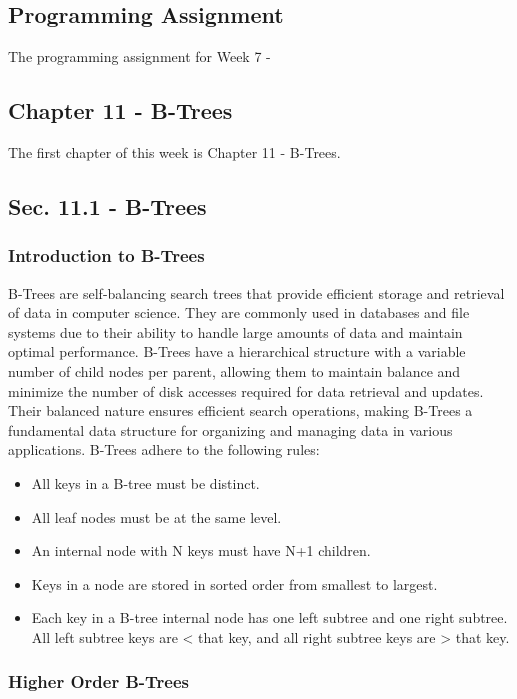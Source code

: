 \subsection{Programming Assignment}

The programming assignment for Week 7 - 

\subsection{Chapter 11 - B-Trees}

The first chapter of this week is Chapter 11 - B-Trees.

\subsection*{Sec. 11.1 - B-Trees}

\subsubsection{Introduction to B-Trees}

B-Trees are self-balancing search trees that provide efficient storage and retrieval of data in computer science. They are commonly used in databases and file systems due to their ability to handle large amounts of data and maintain optimal performance. B-Trees have a hierarchical structure with a variable number of child nodes per parent, 
allowing them to maintain balance and minimize the number of disk accesses required for data retrieval and updates. Their balanced nature ensures efficient search operations, making B-Trees a fundamental data structure for organizing and managing data in various applications. B-Trees adhere to the following rules:

\begin{itemize}
    \item All keys in a B-tree must be distinct.
    \item All leaf nodes must be at the same level.
    \item An internal node with N keys must have N+1 children.
    \item Keys in a node are stored in sorted order from smallest to largest.
    \item Each key in a B-tree internal node has one left subtree and one right subtree. All left subtree keys are < that key, and all right subtree keys are > that key.
\end{itemize}

\subsubsection{Higher Order B-Trees}

